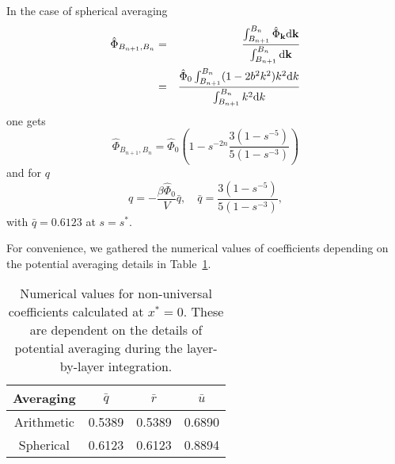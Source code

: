In the case of spherical averaging
\begin{eqnarray}
	\label{def:spheric_average}
	\hat{\Phi}_{B_{n+1}, B_n} & = &  \frac{\int_{B_{n+1}}^{B_n} \hat{\Phi}_{\vb k} {\rm d} {\vb k}}
	{\int_{B_{n+1}}^{B_n} {\rm d} {\vb k}} 
	\nonumber
	\\
	& = & \frac{\hat{\Phi}_0 \int_{B_{n+1}}^{B_n} (1 - 2b^2k^2) k^2 {\rm d} k}{\int_{B_{n+1}}^{B_n} k^2 {\rm d} k}
\end{eqnarray}
one gets
\begin{equation*}
	\hat{\Phi}_{B_{n+1}, B_n} = \hat{\Phi}_0 \left(1 - s^{-2n} \frac{3(1 - s^{-5})}{5(1 - s^{-3})}\right)
\end{equation*}
and for $q$
\begin{equation*}
	q = -\frac{\beta \hat{\Phi}_0}{V} \bar{q}, \quad \bar{q} = \frac{3(1 - s^{-5})}{5(1 - s^{-3})},
\end{equation*}
with $\bar{q} = 0.6123$ at $s = s^*$.

For convenience, we gathered the numerical values of coefficients depending on the potential averaging details in Table~\ref{tab:num_coef_vs_average}.
\\

\begin{table}[h]
	\noindent\caption{Numerical values for non-universal coefficients calculated at $x^* = 0$. These are dependent on the details of potential averaging during the layer-by-layer integration.}\vskip3mm
	\begin{tabular}{|c|c|c|c|}
		\hline
		Averaging & $\bar{q}$ \quad & $\bar{r}$ & $\bar{u}$ \\
		\hline
		Arithmetic & 0.5389  & 0.5389 & 0.6890 \\
		Spherical & 0.6123 & 0.6123 & 0.8894 \\
		\hline
	\end{tabular}
	\label{tab:num_coef_vs_average}
\end{table}

